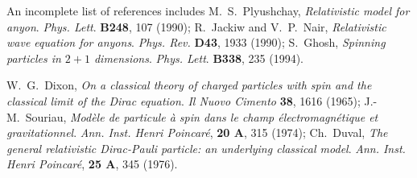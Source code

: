 \documentclass[a4paper,11pt]{article}
\begin{document}
\begin{thebibliography}{99}
An incomplete list of references includes
M.~S.~Plyushchay,
{\it Relativistic model for anyon}.
{\sl Phys. Lett}. {\bf B248}, 107 (1990);
R.~Jackiw and V.~P.~Nair,
{\it Relativistic wave equation for anyons}.
{\sl Phys. Rev.} {\bf D43}, 1933 (1990);
S.~Ghosh,
{\it Spinning particles in $2+1$ dimensions}.
{\sl Phys. Lett}. {\bf B338}, 235 (1994).


W.~G.~Dixon,
  {\it On a classical theory of charged particles with spin and the
  classical limit of the Dirac equation}.
  {\sl Il Nuovo Cimento} {\bf 38}, 1616 (1965);
J.-M.~Souriau,
{\it Mod\`ele de particule \`a spin dans le champ
\'electromagn\'etique et gravitationnel}.
  {\sl Ann. Inst. Henri Poincar\'e}, {\bf 20 A}, 315 (1974);
Ch.~Duval,
{\it The general relativistic Dirac-Pauli particle:
an underlying classical model}.
{\sl Ann. Inst. Henri Poincar\'e}, {\bf 25 A}, 345 (1976).


\end{thebibliography}
\end{document}
